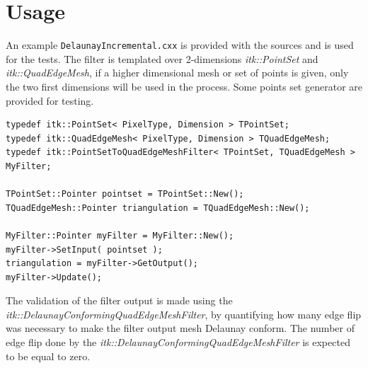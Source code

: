 \documentclass{InsightArticle}
\begin{document}
\begin{figure}
\label{fig:Algo}
\end{figure}

\section{Usage}

An example \texttt{DelaunayIncremental.cxx} is provided with the sources and is used for the tests. The filter is templated over 2-dimensions \textit{itk::PointSet} and \textit{itk::QuadEdgeMesh}, if a higher dimensional mesh or set of points is given, only the two first dimensions will be used in the process. Some points set generator are provided for testing.

\begin{verbatim}
typedef itk::PointSet< PixelType, Dimension > TPointSet;
typedef itk::QuadEdgeMesh< PixelType, Dimension > TQuadEdgeMesh;
typedef itk::PointSetToQuadEdgeMeshFilter< TPointSet, TQuadEdgeMesh > MyFilter;

TPointSet::Pointer pointset = TPointSet::New();
TQuadEdgeMesh::Pointer triangulation = TQuadEdgeMesh::New();

MyFilter::Pointer myFilter = MyFilter::New();
myFilter->SetInput( pointset );
triangulation = myFilter->GetOutput();
myFilter->Update();
\end{verbatim}

The validation of the filter output is made using the \emph{itk::DelaunayConformingQuadEdgeMeshFilter}, by quantifying how many edge flip was necessary to make the filter output mesh Delaunay conform. The number of edge flip done by the \emph{itk::DelaunayConformingQuadEdgeMeshFilter} is expected to be equal to zero.
\end{document}
